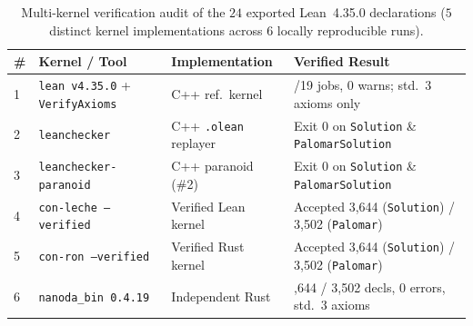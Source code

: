 \documentclass[11pt,reqno]{amsart}
\theoremstyle{definition}
\begin{document}
\begin{table}[ht]
\centering
\caption{Multi-kernel verification audit of the $24$ exported Lean~4.35.0 declarations ($5$ distinct kernel implementations across $6$ locally reproducible runs).}
\label{tab:kernels}
\footnotesize
\setlength{\tabcolsep}{4pt}
\begin{tabular}{@{}ll>{\raggedright\arraybackslash}p{3.4cm}>{\raggedright\arraybackslash}p{6.7cm}@{}}
\toprule
\textbf{\#} & \textbf{Kernel / Tool} & \textbf{Implementation} & \textbf{Verified Result} \\
\midrule
1 & \texttt{lean v4.35.0} + \texttt{VerifyAxioms} & C++ ref.\ kernel & 19/19 jobs, 0 warns; std.\ 3 axioms only \\
2 & \texttt{leanchecker} & C++ \texttt{.olean} replayer & Exit 0 on \texttt{Solution} \& \texttt{PalomarSolution} \\
3 & \texttt{leanchecker-paranoid} & C++ paranoid (\#2) & Exit 0 on \texttt{Solution} \& \texttt{PalomarSolution} \\
4 & \texttt{con-leche --verified} & Verified Lean kernel & Accepted 3,644 (\texttt{Solution}) / 3,502 (\texttt{Palomar}) \\
5 & \texttt{con-ron --verified} & Verified Rust kernel & Accepted 3,644 (\texttt{Solution}) / 3,502 (\texttt{Palomar}) \\
6 & \texttt{nanoda\_bin 0.4.19} & Independent Rust & 3,644 / 3,502 decls, 0 errors, std.\ 3 axioms \\
\bottomrule
\end{tabular}
\end{table}
\end{document}
